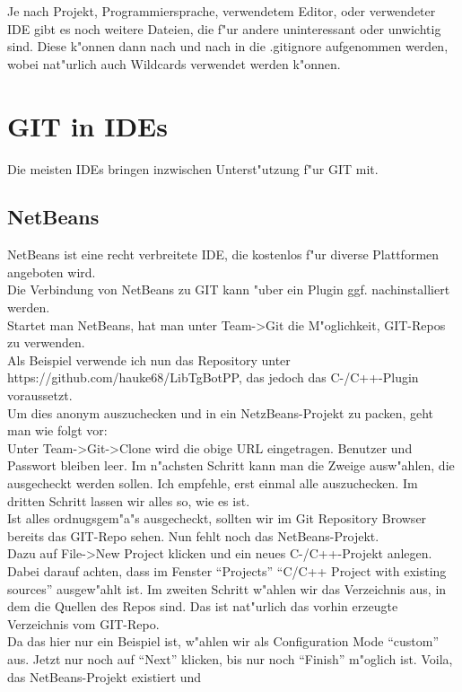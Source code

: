 \documentclass[german,a4paper]{report}
\begin{document}
Je nach Projekt, Programmiersprache, verwendetem Editor, oder
verwendeter IDE gibt es noch weitere Dateien, die f"ur andere
uninteressant oder unwichtig sind. Diese k"onnen dann nach
und nach in die .gitignore aufgenommen werden, wobei nat"urlich
auch Wildcards verwendet werden k"onnen.

\chapter{GIT in IDEs}
Die meisten IDEs bringen inzwischen Unterst"utzung f"ur GIT mit.\\

\section{NetBeans}
NetBeans ist eine recht verbreitete IDE, die kostenlos f"ur diverse
Plattformen angeboten wird.\\
Die Verbindung von NetBeans zu GIT kann "uber ein Plugin ggf.
nachinstalliert werden.\\
Startet man NetBeans, hat man unter Team->Git die M"oglichkeit,
GIT-Repos zu verwenden.\\
Als Beispiel verwende ich nun das Repository unter
https://github.com/hauke68/LibTgBotPP, das jedoch das C-/C++-Plugin
voraussetzt.\\
Um dies anonym auszuchecken und in ein NetzBeans-Projekt zu packen,
geht man wie folgt vor:\\
Unter Team->Git->Clone wird die obige URL eingetragen. Benutzer
und Passwort bleiben leer. Im n"achsten Schritt kann man die
Zweige ausw"ahlen, die ausgecheckt werden sollen. Ich empfehle,
erst einmal alle auszuchecken. Im dritten Schritt lassen wir alles
so, wie es ist.\\
Ist alles ordnugsgem"a"s ausgecheckt, sollten wir im Git Repository
Browser bereits das GIT-Repo sehen. Nun fehlt noch das NetBeans-Projekt.\\
Dazu auf File->New Project klicken und ein neues C-/C++-Projekt anlegen.
Dabei darauf achten, dass im Fenster ``Projects'' ``C/C++ Project with
existing sources'' ausgew"ahlt ist. Im zweiten Schritt w"ahlen wir
das Verzeichnis aus, in dem die Quellen des Repos sind. Das ist nat"urlich
das vorhin erzeugte Verzeichnis vom GIT-Repo.\\
Da das hier nur ein Beispiel ist, w"ahlen wir als Configuration Mode
``custom'' aus. Jetzt nur noch auf ``Next'' klicken, bis nur noch
``Finish'' m"oglich ist. Voila, das NetBeans-Projekt existiert und
\end{document}
